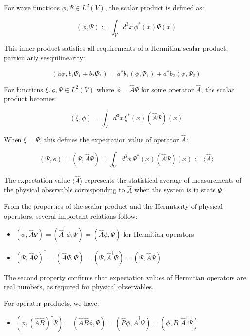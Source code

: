 \documentclass[italian]{HKNdocument}
\begin{document}
For wave functions $\phi, \Psi \in L^2(V)$, the scalar product is defined as:

\begin{equation}
(\phi, \Psi) := \int_V d^3x \, \phi^*(x) \Psi(x)
\end{equation}

This inner product satisfies all requirements of a Hermitian scalar product, particularly sesquilinearity:

\begin{equation}
(a\phi, b_1\Psi_1 + b_2\Psi_2) = a^*b_1(\phi, \Psi_1) + a^*b_2(\phi, \Psi_2)
\end{equation}

For functions $\xi, \phi, \Psi \in L^2(V)$ where $\phi = \hat{A}\Psi$ for some operator $\hat{A}$, the scalar product becomes:

\begin{equation}
(\xi, \phi) = \int_V d^3x \, \xi^*(x)(\hat{A}\Psi)(x)
\end{equation}

When $\xi = \Psi$, this defines the expectation value of operator $\hat{A}$:

\begin{equation}
(\Psi, \phi) = (\Psi, \hat{A}\Psi) = \int_V d^3x \, \Psi^*(x)(\hat{A}\Psi)(x) := \langle\hat{A}\rangle
\end{equation}

The expectation value $\langle\hat{A}\rangle$ represents the statistical average of measurements of the physical observable corresponding to $\hat{A}$ when the system is in state $\Psi$.

From the properties of the scalar product and the Hermiticity of physical operators, several important relations follow:

\begin{itemize}
  \item $(\phi, \hat{A}\Psi) = (\hat{A}^\dagger\phi, \Psi) = (\hat{A}\phi, \Psi)$ for Hermitian operators
  \item $(\Psi, \hat{A}\Psi)^* = (\hat{A}\Psi, \Psi) = (\Psi, \hat{A}^\dagger\Psi) = (\Psi, \hat{A}\Psi)$
\end{itemize}

The second property confirms that expectation values of Hermitian operators are real numbers, as required for physical observables.

For operator products, we have:
\begin{itemize}
  \item $(\phi, (\hat{A}\hat{B})^\dagger\Psi) = (\hat{A}\hat{B}\phi, \Psi) = (\hat{B}\phi, \hat{A}^\dagger\Psi) = (\phi, \hat{B}^\dagger\hat{A}^\dagger\Psi)$
\end{itemize}
\end{document}

